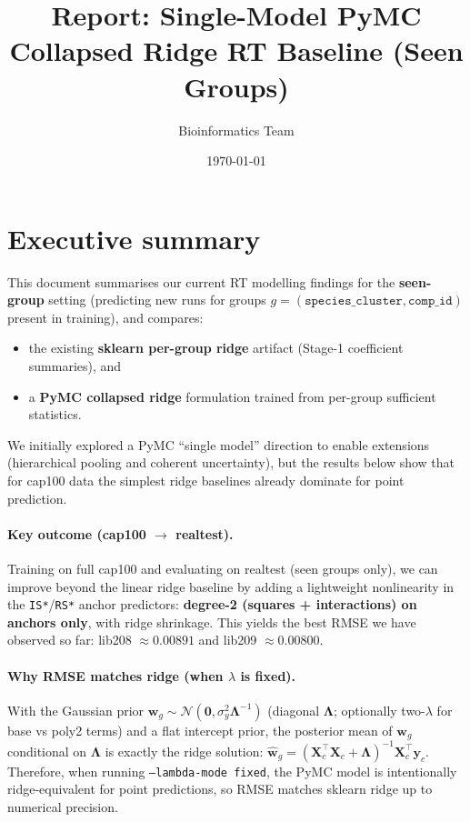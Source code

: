 \documentclass[11pt]{article}
\title{Report: Single-Model PyMC Collapsed Ridge RT Baseline (Seen Groups)}
\author{Bioinformatics Team}
\date{\today}
\begin{document}
\maketitle

\section{Executive summary}

This document summarises our current RT modelling findings for the \textbf{seen-group} setting
(predicting new runs for groups $g = (\texttt{species\_cluster}, \texttt{comp\_id})$ present in training),
and compares:
\begin{itemize}
  \item the existing \textbf{sklearn per-group ridge} artifact (Stage-1 coefficient summaries), and
  \item a \textbf{PyMC collapsed ridge} formulation trained from per-group sufficient statistics.
\end{itemize}

We initially explored a PyMC ``single model'' direction to enable extensions (hierarchical pooling and coherent uncertainty), but the
results below show that for cap100 data the simplest ridge baselines already dominate for point prediction.

\paragraph{Key outcome (cap100 $\rightarrow$ realtest).}
Training on full cap100 and evaluating on realtest (seen groups only), we can improve beyond the linear ridge baseline by adding a
lightweight nonlinearity in the \texttt{IS*}/\texttt{RS*} anchor predictors:
\textbf{degree-2 (squares + interactions) on anchors only}, with ridge shrinkage.
This yields the best RMSE we have observed so far:
lib208 $\approx 0.00891$ and lib209 $\approx 0.00800$.

\paragraph{Why RMSE matches ridge (when $\lambda$ is fixed).}
With the Gaussian prior $\bm{w}_g \sim \mathcal{N}(\bm{0}, \sigma_y^2 \bm{\Lambda}^{-1})$ (diagonal $\bm{\Lambda}$; optionally
two-$\lambda$ for base vs poly2 terms) and a flat intercept prior, the posterior mean of $\bm{w}_g$ conditional on
$\bm{\Lambda}$ is exactly the ridge solution:
$\hat{\bm{w}}_g = (\bm{X}_c^\top \bm{X}_c + \bm{\Lambda})^{-1}\bm{X}_c^\top \bm{y}_c$.
Therefore, when running \texttt{--lambda-mode fixed}, the PyMC model is intentionally ridge-equivalent for point predictions,
so RMSE matches sklearn ridge up to numerical precision.
\end{document}
